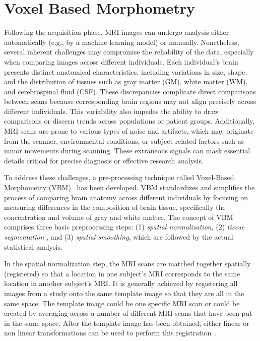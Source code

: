 \section{Voxel Based Morphometry}
Following the acquisition phase, MRI images can undergo analysis either
automatically (e.g., by a machine learning model) or manually. Nonetheless,
several inherent challenges may compromise the reliability of the data,
especially when comparing images across different individuals. Each individual's
brain presents distinct anatomical characteristics, including variations in
size, shape, and the distribution of tissues such as gray matter (GM), white
matter (WM), and cerebrospinal fluid (CSF). These discrepancies complicate
direct comparisons between scans because corresponding brain regions may not
align precisely across different individuals. This variability also impedes the
ability to draw comparisons or discern trends across populations or patient
groups. Additionally, MRI scans are prone to various types of noise and
artifacts, which may originate from the scanner, environmental conditions, or
subject-related factors such as minor movements during scanning. These
extraneous signals can mask essential details critical for precise diagnosis or
effective research analysis.

To address these challenges, a pre-processing technique called Voxel-Based
Morphometry (VBM)~ has been developed. VBM
standardizes and simplifies the process of comparing brain anatomy across
different individuals by focusing on measuring differences in the composition of
brain tissue, specifically the concentration and volume of gray and white
matter. The concept of VBM comprises three basic preprocessing steps: (1)
\emph{spatial normalization}, (2) \emph{tissue segmentation} , and (3)
\emph{spatial smoothing}, which are followed by the actual statistical analysis.

In the spatial normalization step, the MRI scans are matched together spatially
(registered) so that a location in one subject's MRI corresponds to the same
location in another subject's MRI. It is generally achieved by registering all
images from a study onto the same template image
so that they are all in the same space. The template image could be one specific
MRI scan or could be created by averaging across a number of different MRI scans
that have been put in the same space.  After the template image has been
obtained, either linear or non linear transformations can be used to perform
this registration~. 

